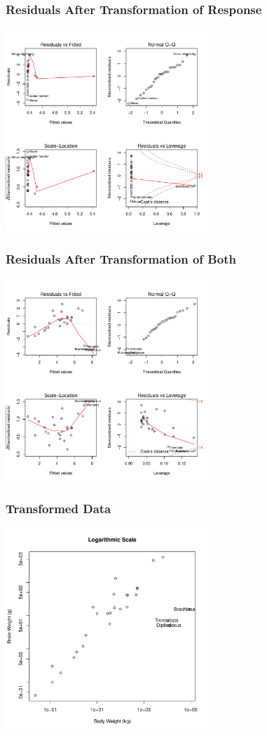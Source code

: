 \documentclass[handout]{beamer}
\begin{document}
  \begin{frame}
    \frametitle{ Residuals After Transformation of Response}

\centerline{\includegraphics[height=3in]{brain-resid-logY}}

  \end{frame}
  \begin{frame}
    \frametitle{ Residuals After Transformation of Both}

\centerline{\includegraphics[height=3in]{brains-tran}}

  \end{frame}

 \begin{frame}
    \frametitle{ Transformed Data}

\centerline{\includegraphics[height=3in]{brain-log}}

  \end{frame}
\end{document}
